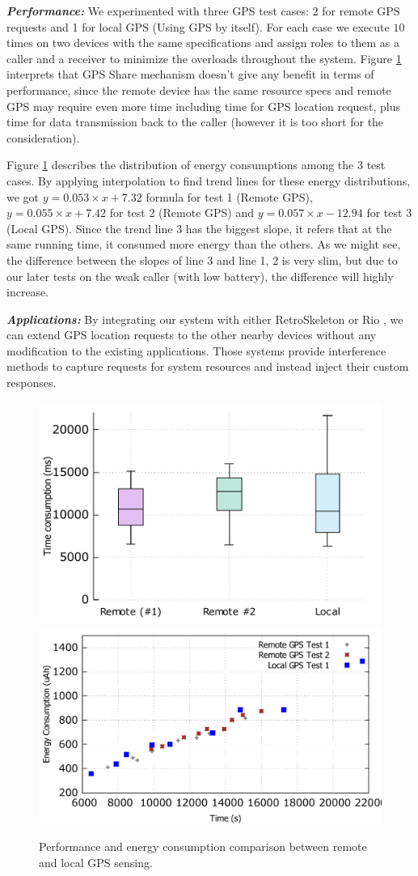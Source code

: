 \documentclass{sig-alternate}
\begin{document}
\textbf{\emph{Performance:}}
We experimented with three GPS test cases: 2 for remote GPS requests and 1 for local GPS (Using GPS by itself). For each case we execute $10$ times on two devices with the same specifications and assign roles to them as a caller and a receiver to minimize the overloads throughout the system. Figure \ref{fig:gps_perf} interprets that GPS Share mechanism doesn't give any benefit in terms of performance, since the remote device has the same resource specs and remote GPS may require even more time including time for GPS location request, plus time for data transmission back to the caller (however it is too short for the consideration).

Figure \ref{fig:gps_perf} describes the distribution of energy consumptions among the 3 test cases. By applying interpolation to find trend lines for these energy distributions, we got $y = 0.053 \times x + 7.32$ formula for test 1 (Remote GPS), $y = 0.055 \times x + 7.42$ for test 2 (Remote GPS) and $y = 0.057 \times x - 12.94$ for test 3 (Local GPS). Since the trend line 3 has the biggest slope, it refers that at the same running time, it consumed more energy than the others. As we might see, the difference between the slopes of line 3 and line 1, 2 is very slim, but due to our later tests on the weak caller (with low battery), the difference will highly increase. 

\textbf{\emph{Applications:}}
By integrating our system with either RetroSkeleton \cite{retro-skel} or Rio \cite{rio}, we can extend GPS location requests to the other nearby devices without any modification to the existing applications. Those systems provide interference methods to capture requests for system resources and instead inject their custom responses. 

\begin{figure}
	\centering
		\includegraphics[width=.42\textwidth]{data/gps_perf.pdf}
		\includegraphics[width=.47\textwidth]{data/gps_energy_full.pdf}
	\caption{Performance and energy consumption comparison between remote and local GPS sensing.}
	\label{fig:gps_perf}
\end{figure}
\end{document}
